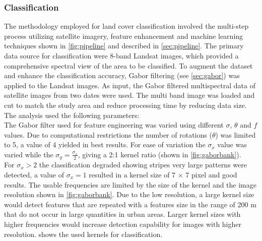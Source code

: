\documentclass[12pt,a4paper, english,twoside]{scrartcl}
\begin{document}
    \subsubsection{Classification }\label{sec:classification}
      The methodology employed for land cover classification involved the multi-step process utilizing satellite imagery, feature enhancement and machine learning techniques shown in \cref{fig:pipeline} and described in \cref{sec:pipeline}.
      The primary data source for classification were 8-band Landsat images, which provided a comprehensive spectral view of the area to be classified.
      To augment the dataset and enhance the classification accuracy, Gabor filtering (see \cref{sec:gabor}) was applied to the Landsat images.
      As input, the Gabor filtered multispectral data of satellite images from two dates were used.
      The multi band image was loaded and cut to match the study area and reduce processing time by reducing data size.  \\
      The analysis used the following parameters: \\
      The Gabor filter used for feature engineering was varied using different $\sigma$, $\theta$ and $f$ values.
      Due to computational restrictions the number of rotations ($\theta$) was limited to 5, a value of 4 yielded in best results. 
      For ease of variation the $\sigma_x$ value was varied while the $\sigma_y = \frac{\sigma_x}{2}$, giving a 2:1 kernel ratio (shown in \cref{fig:gaborbank}).\\
      For $\sigma_x > 2$ the classification degraded showing stripes very large patterns were detected, a value of $\sigma_x = 1$ resulted in a kernel size of 7 $\times$ 7 pixel and good results.
      The usable frequencies are limited by the size of the kernel and the image resolution shown in \cref{fig:gaborbank}.
      Due to the low resolution, a large kernel size would detect features that are repeated with a features size in the range of 200 m that do not occur in large quantities in urban areas. 
      Larger kernel sizes with higher frequencies would increase detection capability for images with higher resolution. 
     shows the used kernels for classification.
\end{document}
